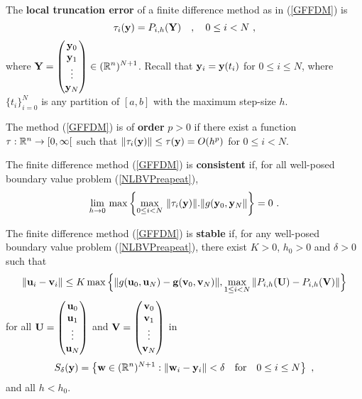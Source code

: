 \begin{defn}
The {\bfseries local truncation error} of a finite difference method
as in (\ref{GFFDM}) is
\[
\mathbf{\tau}_i(\mathbf{y}) = P_{i,h}(\mathbf{Y}) \quad , \quad 0 \leq i < N \ ,
\]
where $\displaystyle \mathbf{Y} =
\begin{pmatrix} \mathbf{y}_0 \\ \mathbf{y}_1 \\ \vdots \\
\mathbf{y}_N \end{pmatrix} \in (\mathbb{R}^n)^{N+1}$.
Recall that $\mathbf{y}_i = \mathbf{y}(t_i)$ for $0 \leq i \leq N$, where
$\{t_i\}_{i=0}^N$ is any partition of $[a,b]$ with the
maximum step-size $h$.

The method (\ref{GFFDM}) is of
{\bfseries order} $p>0$ if there
exist a function $\tau :\mathbb{R}^n \to [0,\infty[$ such that
$\| \mathbf{\tau}_i(\mathbf{y}) \| \leq \mathbf{\tau}(\mathbf{y})  = O(h^p)$ for
$0 \leq i < N$.
\end{defn}

\begin{defn}
The finite difference method (\ref{GFFDM}) is
{\bfseries consistent} if, for all
well-posed boundary value problem (\ref{NLBVPreapeat}),
\[
\lim_{h \rightarrow 0}\, \max\left\{
\max_{0 \leq i < N} \, \| \mathbf{\tau}_i(\mathbf{y}) \| .
\| g(\mathbf{y}_0, \mathbf{y}_N \| \right\} = 0 \ .
\]
\end{defn}

\begin{defn}
The finite difference method (\ref{GFFDM}) is
{\bfseries stable} if, for any
well-posed boundary value problem (\ref{NLBVPreapeat}), there exist
$K>0$, $h_0 >0$ and $\delta>0$ such that
\begin{equation} \label{FDMS}
\| \mathbf{u}_i - \mathbf{v}_i \| \leq
K \max \Big\{ \| g(\mathbf{u}_0,\mathbf{u}_N) -
\mathbf{g}(\mathbf{v}_0,\mathbf{v}_N) \| ,
\max_{1\leq i < N} \| P_{i,h}(\mathbf{U}) - P_{i,h}(\mathbf{V}) \| \Big\}
\end{equation}
for all
$\displaystyle \mathbf{U} =
\begin{pmatrix} \mathbf{u}_0 \\ \mathbf{u}_1 \\ \vdots \\ \mathbf{u}_N \end{pmatrix}$
and
$\displaystyle \mathbf{V} =
\begin{pmatrix} \mathbf{v}_0 \\ \mathbf{v}_1 \\ \vdots \\ \mathbf{v}_N \end{pmatrix}$
in
\[
S_\delta(\mathbf{y}) = \left\{ \mathbf{w} \in (\mathbb{R}^n)^{N+1} :
\| \mathbf{w}_i - \mathbf{y}_i \| < \delta
\quad \text{for} \quad 0 \leq i \leq N \right\} \ ,
\]
and all $h < h_0$.
\end{defn}

